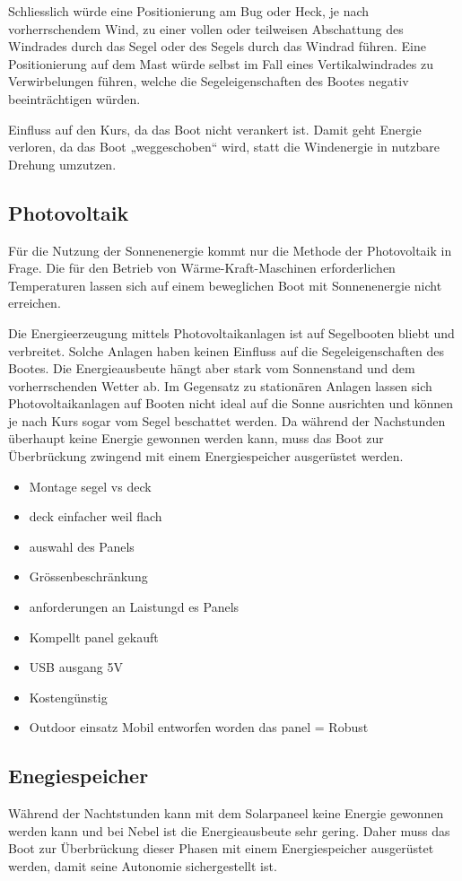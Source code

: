 Schliesslich würde eine Positionierung am Bug oder Heck, je nach vorherrschendem Wind, zu einer vollen oder teilweisen Abschattung des Windrades durch das Segel oder des Segels durch das Windrad führen. Eine Positionierung auf dem Mast würde selbst im Fall eines Vertikalwindrades zu Verwirbelungen führen, welche die Segeleigenschaften des Bootes negativ beeinträchtigen würden. 

Einfluss auf den Kurs, da das Boot nicht verankert ist. Damit geht Energie verloren, da das Boot „weggeschoben“ wird, statt die Windenergie in nutzbare Drehung umzutzen.

\subsection{Photovoltaik}
Für die Nutzung der Sonnenenergie kommt nur die Methode der Photovoltaik in Frage. Die für den Betrieb von Wärme-Kraft-Maschinen erforderlichen Temperaturen lassen sich auf einem beweglichen Boot mit Sonnenenergie nicht erreichen.

Die Energieerzeugung mittels Photovoltaikanlagen ist auf Segelbooten bliebt und verbreitet. Solche Anlagen haben keinen Einfluss auf die Segeleigenschaften des Bootes. Die Energieausbeute hängt aber stark vom Sonnenstand und dem vorherrschenden Wetter ab. Im Gegensatz zu stationären Anlagen lassen sich Photovoltaikanlagen auf Booten nicht ideal auf die Sonne ausrichten und können je nach Kurs sogar vom Segel beschattet werden. Da während der Nachstunden überhaupt keine Energie gewonnen werden kann, muss das Boot zur Überbrückung zwingend mit einem Energiespeicher ausgerüstet werden.

\begin{itemize}
    \item Montage segel vs deck
    \item deck einfacher weil flach
    \item auswahl des Panels
    \item Grössenbeschränkung
    \item anforderungen an Laistungd es Panels
    \item Kompellt panel gekauft
    \item USB ausgang 5V
    \item Kostengünstig
    \item Outdoor einsatz Mobil entworfen worden das panel = Robust


\end{itemize}

\subsection{Enegiespeicher}
Während der Nachtstunden kann mit dem Solarpaneel keine Energie gewonnen werden kann und bei Nebel ist die Energieausbeute sehr gering. Daher muss das Boot zur Überbrückung dieser Phasen mit einem Energiespeicher ausgerüstet werden, damit seine Autonomie sichergestellt ist.

